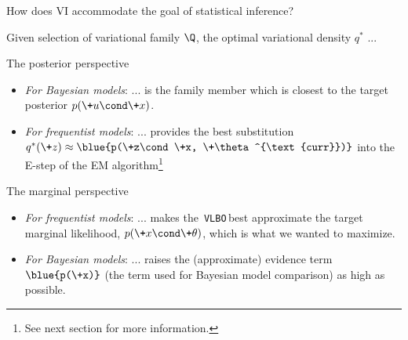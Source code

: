 \documentclass[10pt]{beamer}
\newcommand{\VLBO}{\,\texttt{VLBO}\,}
\begin{document}
\begin{frame}{How does VI accommodate the goal of statistical inference?}

Given selection of variational family $\Q$, the optimal variational density $q^*$ ...

\begin{block}{The posterior perspective}

\begin{itemize}
\item \textit{For Bayesian models}:  ...  is the family member which is closest to the\alert{ target  posterior $p(\+u \cond \+x)$}.
\item \textit{For frequentist models}: ... provides the best substitution $q^*(\+z) \approx \blue{p(\+z\cond \+x, \+\theta^{\text{curr}})}$ into the E-step of the EM algorithm\footnote{See next section for more information.}
\end{itemize}

\end{block} 
\pause 
{}
\begin{block}{The marginal perspective}

\begin{itemize}


\item \textit{For frequentist models}: ... makes the \VLBO best approximate the  \alert{target marginal likelihood, $p(\+x \cond \+\theta)$}, which is what we wanted to maximize.
\item \textit{For Bayesian models}: ... raises the (approximate) evidence term $\blue{p(\+x)}$ (the term used for Bayesian model comparison) as high as possible. %
\end{itemize}

\end{block} 

\end{frame}
\end{document}
